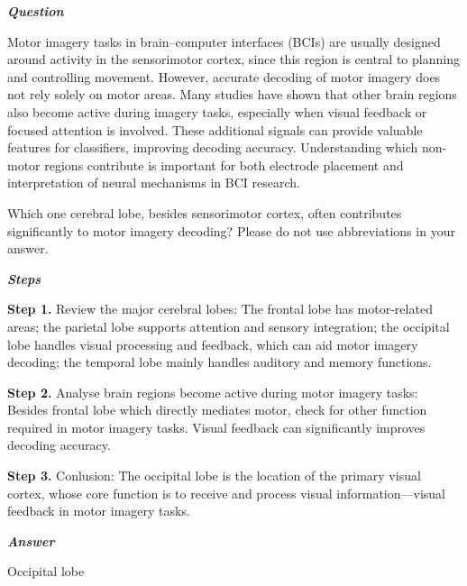 \begin{tcolorbox}[
    breakable,
    title=Example of Scientific Deep Research in Neuroscience,
    colback=LighterGray,
    colframe=DeepPurple,
    colbacktitle=DeepPurple,
    coltitle=White,
]
\textbf{\emph{\textcolor{DeepPurple}{Question}}}

Motor imagery tasks in brain–computer interfaces (BCIs) are usually designed around activity in the sensorimotor cortex, since this region is central to planning and controlling movement. However, accurate decoding of motor imagery does not rely solely on motor areas. Many studies have shown that other brain regions also become active during imagery tasks, especially when visual feedback or focused attention is involved. These additional signals can provide valuable features for classifiers, improving decoding accuracy. Understanding which non-motor regions contribute is important for both electrode placement and interpretation of neural mechanisms in BCI research.

Which one cerebral lobe, besides sensorimotor cortex, often contributes significantly to motor imagery decoding? Please do not use abbreviations in your answer.

\textbf{\emph{\textcolor{DeepPurple}{Steps}}}

\textbf{\textcolor{CaseOrange}{Step 1.}} Review the major cerebral lobes: The frontal lobe has motor-related areas; the parietal lobe supports attention and sensory integration; the occipital lobe handles visual processing and feedback, which can aid motor imagery decoding; the temporal lobe mainly handles auditory and memory functions.

\textbf{\textcolor{CaseOrange}{Step 2.}} Analyse brain regions become active during motor imagery tasks: Besides frontal lobe which directly mediates motor, check for other function required in motor imagery tasks. Visual feedback can significantly improves decoding accuracy.

\textbf{\textcolor{CaseOrange}{Step 3.}} Conlusion: The occipital lobe is the location of the primary visual cortex, whose core function is to receive and process visual information—visual feedback in motor imagery tasks.


\textbf{\emph{\textcolor{DeepPurple}{Answer}}}

Occipital lobe

\end{tcolorbox}
